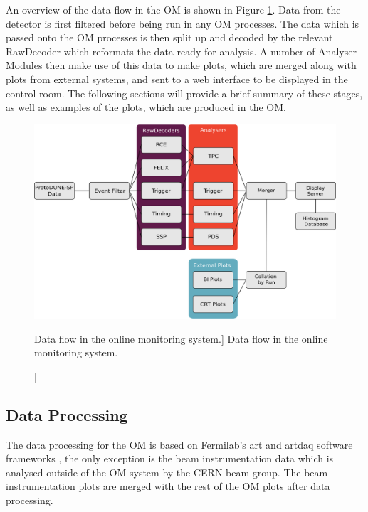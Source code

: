 An overview of the data flow in the OM is shown in Figure \ref{fig:om_flow}. 
Data from the detector is first filtered before being run in any OM processes. 
The data which is passed onto the OM processes is then split up and decoded by 
the relevant RawDecoder which reformats the data ready for analysis. A number 
of Analyser Modules then make use of this data to make plots, which are merged 
along with plots from external systems, and sent to a web interface to be 
displayed in the control room. The following sections will provide a brief 
summary of these stages, as well as examples of the plots, which are produced in
the OM.

\begin{figure}

	\centering

	\includegraphics[width=\textwidth]{figures/om_flow.png}

	\caption
	[Data flow in the \protodune{} online monitoring system.]
	{Data flow in the \protodune{} online monitoring system.}

	\label{fig:om_flow}

\end{figure}

\subsection{Data Processing}
The data processing for the OM is based on Fermilab's art and artdaq software
frameworks \cite{Green:2012gv, 6495515}, the only exception is the beam 
instrumentation data which is analysed outside of the OM system by the CERN 
beam group. The beam instrumentation plots are merged with the rest of the OM 
plots after data processing.

